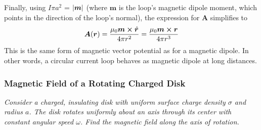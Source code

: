 \documentclass[11pt, a4paper]{article}
\renewcommand{\vec}[1]{\bm{#1}} %
\newcommand{\uvec}[1]{\hat{\vec{#1}}} %
\renewcommand{\r}{\vec{r}}
\newcommand{\A}{\vec{A}}  %
\newcommand{\m}{\vec{m}}  %
\begin{document}
\begin{itemize}
	
	Finally, using $ I \pi a^{2} $ = $ \abs{\vec{m}} $ (where $ \m $ is the loop's magnetic dipole moment, which points in the direction of the loop's normal), the expression for $ \A $ simplifies to
	\begin{equation*}
		\A(\r) = \frac{\mu_{0} \m \cross \uvec{r}}{4\pi r^{2}} = \frac{\mu_{0} \m \cross \r}{4\pi r^{3}}
	\end{equation*}
	This is the same form of magnetic vector potential as for a magnetic dipole. In other words, a circular current loop behaves as magnetic dipole at long distances.
	
\end{itemize}

\subsubsection{Magnetic Field of a Rotating Charged Disk}
\textit{Consider a charged, insulating disk with uniform surface charge density $ \sigma $ and radius $ a $. The disk rotates uniformly about an axis through its center with constant angular speed $ \omega $. Find the magnetic field along the axis of rotation.}
\end{document}

